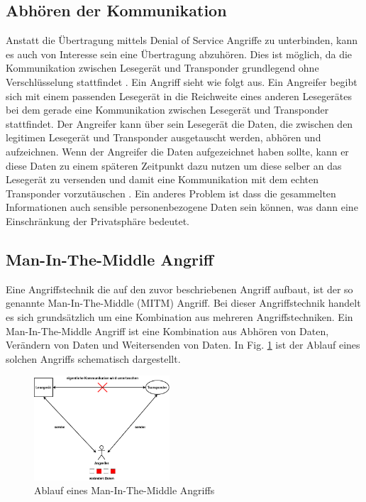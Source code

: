 \documentclass[conference]{IEEEtran}
\begin{document}
\subsection{Abhören der Kommunikation}
Anstatt die Übertragung mittels Denial of Service Angriffe zu unterbinden, kann es auch von Interesse sein eine Übertragung abzuhören. Dies ist möglich, da die Kommunikation zwischen Lesegerät und Transponder grundlegend ohne Verschlüsselung stattfindet \cite{b3}. Ein Angriff sieht wie folgt aus. Ein Angreifer begibt sich mit einem passenden Lesegerät in die Reichweite eines anderen Lesegerätes bei dem gerade eine Kommunikation zwischen Lesegerät und Transponder stattfindet. Der Angreifer kann über sein Lesegerät die Daten, die zwischen den legitimen Lesegerät und Transponder ausgetauscht werden, abhören und aufzeichnen. Wenn der Angreifer die Daten aufgezeichnet haben sollte, kann er diese Daten zu einem späteren Zeitpunkt dazu nutzen um diese selber an das Lesegerät zu versenden und damit eine Kommunikation mit dem echten Transponder vorzutäuschen \cite{b8}. Ein anderes Problem ist dass die gesammelten Informationen auch sensible personenbezogene Daten sein können, was dann eine Einschränkung der Privatsphäre bedeutet.

\subsection{Man-In-The-Middle Angriff}
Eine Angriffstechnik die auf den zuvor beschriebenen Angriff aufbaut, ist der so genannte Man-In-The-Middle (MITM) Angriff. Bei dieser Angriffstechnik handelt es sich grundsätzlich um eine Kombination aus mehreren Angriffstechniken. Ein Man-In-The-Middle Angriff ist eine Kombination aus Abhören von Daten, Verändern von Daten und Weitersenden von Daten. In Fig. \ref{fig3} ist der Ablauf eines solchen Angriffs schematisch dargestellt.

\begin{figure}[htbp]
\centerline{\includegraphics[width=0.45\textwidth]{img/MITM.png}}
\caption{Ablauf eines Man-In-The-Middle Angriffs}
\label{fig3}
\end{figure}
\end{document}
